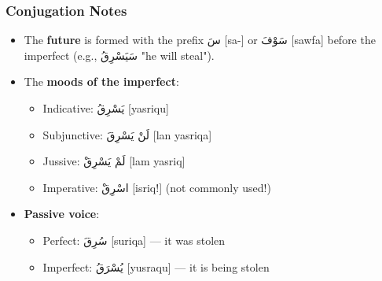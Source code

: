 \documentclass[letterpaper,12pt]{article}
\begin{document}
\subsubsection*{Conjugation Notes}
\begin{itemize}
  \item The \textbf{future} is formed with the prefix \textarabic{سَ} [sa-] or \textarabic{سَوْفَ} [sawfa] before the imperfect (e.g., \textarabic{سَيَسْرِقُ} "he will steal").
  \item The \textbf{moods of the imperfect}: 
    \begin{itemize}
      \item Indicative: \textarabic{يَسْرِقُ} [yasriqu] 
      \item Subjunctive: \textarabic{لَنْ يَسْرِقَ} [lan yasriqa]
      \item Jussive: \textarabic{لَمْ يَسْرِقْ} [lam yasriq]
      \item Imperative: \textarabic{اسْرِقْ} [isriq!] (not commonly used!)
    \end{itemize}
  \item \textbf{Passive voice}: 
    \begin{itemize}
      \item Perfect: \textarabic{سُرِقَ} [suriqa] — it was stolen
      \item Imperfect: \textarabic{يُسْرَقُ} [yusraqu] — it is being stolen
    \end{itemize}
\end{itemize}
\end{document}
